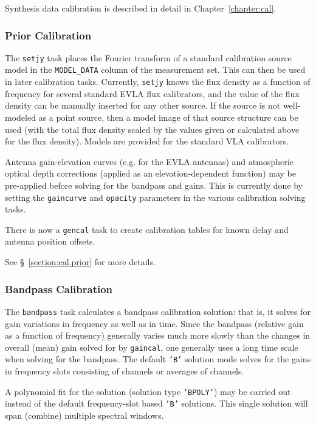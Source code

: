 Synthesis data calibration is described in detail in
Chapter~\ref{chapter:cal}. 

\subsubsection{Prior Calibration}
\label{section:intro.walkthru.calib.prior}

The {\tt setjy} task places the Fourier transform of a standard
calibration source model in the {\tt MODEL\_DATA} column of the
measurement set.  This can then be used in later calibration tasks.
Currently, {\tt setjy} knows the flux density as a function of
frequency for several standard EVLA flux calibrators, and the value of
the flux density can be manually inserted for any other source.  If
the source is not well-modeled as a point source, then a model image
of that source structure can be used (with the total flux density
scaled by the values given or calculated above for the flux density).
Models are provided for the standard VLA calibrators.

Antenna gain-elevation curves (e.g. for the EVLA antennas) and
atmospheric optical depth corrections (applied as an
elevation-dependent function) may
be pre-applied before solving for the bandpass and gains.  This
is currently done by setting the {\tt gaincurve} and {\tt opacity}
parameters in the various calibration solving tasks.

There is now a {\tt gencal} task to create calibration tables for
known delay and antenna position offsets.

See \S~\ref{section:cal.prior} for more details.

\subsubsection{Bandpass Calibration}
\label{section:intro.walkthru.calib.bpass}

The {\tt bandpass} task
calculates a bandpass calibration solution: that is, it solves for
gain variations in frequency as well as in time.   Since the bandpass
(relative gain as a function of frequency) generally varies much more slowly 
than the changes in overall (mean) gain solved for by {\tt gaincal}, one
generally uses a long time scale when solving for the bandpass. The
default {\tt 'B'} solution mode solves for the gains in frequency
slots consisting of channels or averages of channels.

A polynomial fit for the solution (solution type {\tt 'BPOLY'}) may be
carried out instead of the default frequency-slot based {\tt 'B'}
solutions.  This single solution will span (combine) multiple spectral
windows.

